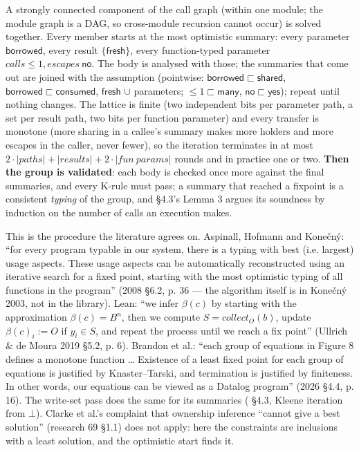 A strongly connected component of the call graph (within one module; the module graph is a DAG, so cross-module recursion cannot occur) is solved together. Every member starts at the most optimistic summary: every parameter $\mathsf{borrowed}$, every result $\{\mathsf{fresh}\}$, every function-typed parameter $\mathit{calls}\le 1,\allowbreak{}\mathit{escapes}\ \mathsf{no}$. The body is analysed with those; the summaries that come out are joined with the assumption (pointwise: $\mathsf{borrowed}\sqsubset \mathsf{shared}$, $\mathsf{borrowed}\sqsubset \mathsf{consumed}$, $\mathsf{fresh}$ $\cup$ parameters; $\le 1\sqsubset \mathsf{many}$, $\mathsf{no}\sqsubset \mathsf{yes}$); repeat until nothing changes. The lattice is finite (two independent bits per parameter path, a set per result path, two bits per function parameter) and every transfer is monotone (more sharing in a callee's summary makes more holders and more escapes in the caller, never fewer), so the iteration terminates in at most $2\cdot\lvert\mathit{paths}\rvert + \lvert\mathit{results}\rvert + 2\cdot\lvert\mathit{fun\ params}\rvert$ rounds and in practice one or two. \textbf{Then the group is validated}: each body is checked once more against the final summaries, and every K-rule must pass; a summary that reached a fixpoint is a consistent \emph{typing} of the group, and §4.3's Lemma 3 argues its soundness by induction on the number of calls an execution makes.

This is the procedure the literature agrees on. Aspinall, Hofmann and Konečný: “for every program typable in our system, there is a typing with best (i.e. largest) usage aspects. These usage aspects can be automatically reconstructed using an iterative search for a fixed point, starting with the most optimistic typing of all functions in the program” (2008 §6.2, p. 36 — the algorithm itself is in Konečný 2003, not in the library). Lean: “we infer $\beta(c)$ by starting with the approximation $\beta(c) = B^n$, then we compute $S = \mathit{collect}_O(b)$, update $\beta(c)_i := O$ if $y_i \in S$, and repeat the process until we reach a fix point” (Ullrich \& de Moura 2019 §5.2, p. 6). Brandon et al.: “each group of equations in Figure 8 defines a monotone function … Existence of a least fixed point for each group of equations is justified by Knaster–Tarski, and termination is justified by finiteness. In other words, our equations can be viewed as a Datalog program” (2026 §4.4, p. 16). The write-set pass does the same for its summaries ( §4.3, Kleene iteration from $\bot$). Clarke et al.'s complaint that ownership inference “cannot give a best solution” (research 69 §1.1) does not apply: here the constraints are inclusions with a least solution, and the optimistic start finds it.

